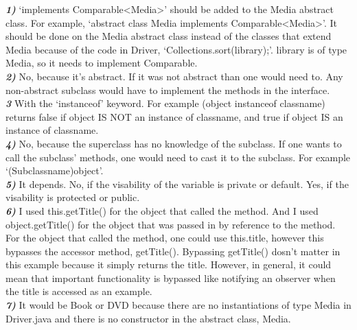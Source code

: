 \documentclass[10pt,letterpaper]{article}
\begin{document}

\textbf{\textit{1)}}
`implements Comparable<Media>' should be added to the Media abstract class.  For example, `abstract class Media implements Comparable<Media>'.  It should be done on the Media abstract class instead of the classes that extend Media because of the code in Driver, `Collections.sort(library);'.  library is of type Media, so it needs to implement Comparable.\\

\textbf{\textit{2)}}
No, because it's abstract.  If it was not abstract than one would need to.  Any non-abstract subclass would have to implement the methods in the interface.\\

\textbf{\textit{3}}
With the `instanceof' keyword.  For example (object instanceof classname) returns false if object IS NOT an instance of classname, and true if object IS an instance of classname.\\

\textbf{\textit{4)}}
No, because the superclass has no knowledge of the subclass.  If one wants to call the subclass' methods, one would need to cast it to the subclass.  For example `(Subclassname)object'.\\

\textbf{\textit{5)}}
It depends.  No, if the visability of the variable is private or default. Yes, if the visability is protected or public.\\

\textbf{\textit{6)}}
I used this.getTitle() for the object that called the method.  And I used object.getTitle() for the object that was passed in by reference to the method.  For the object that called the method, one could use this.title, however this bypasses the accessor method, getTitle().  Bypassing getTitle() dosn't matter in this example because it simply returns the title.  However, in general, it could mean that important functionality is bypassed like notifying an observer when the title is accessed as an example.\\

\textbf{\textit{7)}}
 It would be Book or DVD because there are no instantiations of type Media in Driver.java and there is no constructor in the abstract class, Media.\\
\end{document}
